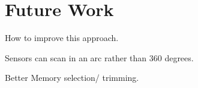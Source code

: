 

\chapter{Future Work}
How to improve this approach.

Sensors can scan in an arc rather than 360 degrees.


Better Memory selection/ trimming.
